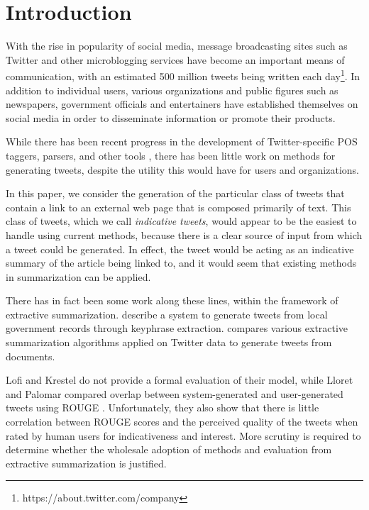 \section{Introduction}
\label{sec:intro}
With the rise in popularity of social media, message broadcasting sites such as Twitter and other microblogging services have become an important means of communication, with an estimated 500 million tweets being written each day\footnote{https://about.twitter.com/company}. In addition to individual users, various organizations and public figures such as newspapers, government officials and entertainers have established themselves on social media in order to disseminate information or promote their products. 

While there has been recent progress in the development of Twitter-specific POS taggers, parsers, and other tools \cite{owoputi-etal-2013,kong-etal-2014}, there has been little work on methods for generating tweets, despite the utility this would have for users and organizations. 

In this paper, we consider the generation of the particular class of tweets that contain a link to an external web page that is composed primarily of text. This class of tweets, which we call \emph{indicative tweets}, would appear to be the easiest to handle using current methods, because there is a clear source of input from which a tweet could be generated. In effect, the tweet would be acting as an indicative summary of the article being linked to, and it would seem that existing methods in summarization can be applied. 

There has in fact been some work along these lines, within the framework of extractive summarization.  describe a system to generate tweets from local government records through keyphrase extraction.  compares various extractive summarization algorithms applied on Twitter data to generate tweets from documents. 

Lofi and Krestel do not provide a formal evaluation of their model, while Lloret and Palomar compared overlap between system-generated and user-generated tweets using ROUGE 
\cite{lin-2004}. Unfortunately, they also show that there is little correlation between ROUGE scores and the perceived quality of the tweets when rated by human users for indicativeness and interest. More scrutiny is required to determine whether the wholesale adoption of methods and evaluation from extractive summarization is justified.

